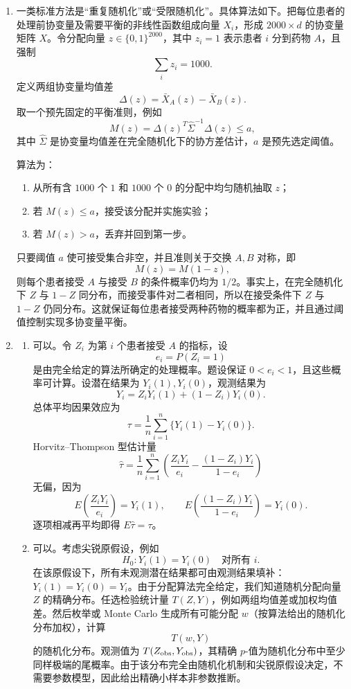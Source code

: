 \documentclass[UTF8,12pt]{ctexart}
\begin{document}
\begin{enumerate}[label=\textbf{\arabic*.},leftmargin=2.2em]
\item 一类标准方法是“重复随机化”或“受限随机化”。具体算法如下。把每位患者的处理前协变量及需要平衡的非线性函数组成向量 \(X_i\)，形成 \(2000\times d\) 的协变量矩阵 \(X\)。令分配向量 \(z\in\{0,1\}^{2000}\)，其中 \(z_i=1\) 表示患者 \(i\) 分到药物 \(A\)，且强制
\[
\sum_i z_i=1000.
\]
定义两组协变量均值差
\[
\Delta(z)=\bar X_A(z)-\bar X_B(z).
\]
取一个预先固定的平衡准则，例如
\[
M(z)=\Delta(z)^T\widehat\Sigma^{-1}\Delta(z)\le a,
\]
其中 \(\widehat\Sigma\) 是协变量均值差在完全随机化下的协方差估计，\(a\) 是预先选定阈值。

算法为：
\begin{enumerate}[label=\textbf{(\roman*)},leftmargin=2.4em]
\item 从所有含 \(1000\) 个 \(1\) 和 \(1000\) 个 \(0\) 的分配中均匀随机抽取 \(z\)；
\item 若 \(M(z)\le a\)，接受该分配并实施实验；
\item 若 \(M(z)>a\)，丢弃并回到第一步。
\end{enumerate}
只要阈值 \(a\) 使可接受集合非空，并且准则关于交换 \(A,B\) 对称，即
\[
M(z)=M(1-z),
\]
则每个患者接受 \(A\) 与接受 \(B\) 的条件概率仍均为 \(1/2\)。事实上，在完全随机化下 \(Z\) 与 \(1-Z\) 同分布，而接受事件对二者相同，所以在接受条件下 \(Z\) 与 \(1-Z\) 仍同分布。这就保证每位患者接受两种药物的概率都为正，并且通过阈值控制实现多协变量平衡。

\item
\begin{enumerate}[label=\textbf{(\alph*)},leftmargin=2.4em]
\item 可以。令 \(Z_i\) 为第 \(i\) 个患者接受 \(A\) 的指标，设
\[
e_i=P(Z_i=1)
\]
是由完全给定的算法所确定的处理概率。题设保证 \(0<e_i<1\)，且这些概率可计算。设潜在结果为 \(Y_i(1),Y_i(0)\)，观测结果为
\[
Y_i=Z_iY_i(1)+(1-Z_i)Y_i(0).
\]
总体平均因果效应为
\[
\tau=\frac1n\sum_{i=1}^n\{Y_i(1)-Y_i(0)\}.
\]
Horvitz--Thompson 型估计量
\[
\hat\tau
=\frac1n\sum_{i=1}^n\left(\frac{Z_iY_i}{e_i}
-\frac{(1-Z_i)Y_i}{1-e_i}\right)
\]
无偏，因为
\[
E\left(\frac{Z_iY_i}{e_i}\right)=Y_i(1),\qquad
E\left(\frac{(1-Z_i)Y_i}{1-e_i}\right)=Y_i(0).
\]
逐项相减再平均即得 \(E\hat\tau=\tau\)。

\item 可以。考虑尖锐原假设，例如
\[
H_0:Y_i(1)=Y_i(0)\quad \text{对所有 }i.
\]
在该原假设下，所有未观测潜在结果都可由观测结果填补：\(Y_i(1)=Y_i(0)=Y_i\)。由于分配算法完全给定，我们知道随机分配向量 \(Z\) 的精确分布。任选检验统计量 \(T(Z,Y)\)，例如两组均值差或加权均值差。然后枚举或 Monte Carlo 生成所有可能分配 \(w\)（按算法给出的随机化分布加权），计算
\[
T(w,Y)
\]
的随机化分布。观测值为 \(T(Z_{\rm obs},Y_{\rm obs})\)，其精确 \(p\)-值为随机化分布中至少同样极端的尾概率。由于该分布完全由随机化机制和尖锐原假设决定，不需要参数模型，因此给出精确小样本非参数推断。
\end{enumerate}
\end{enumerate}
\end{document}
